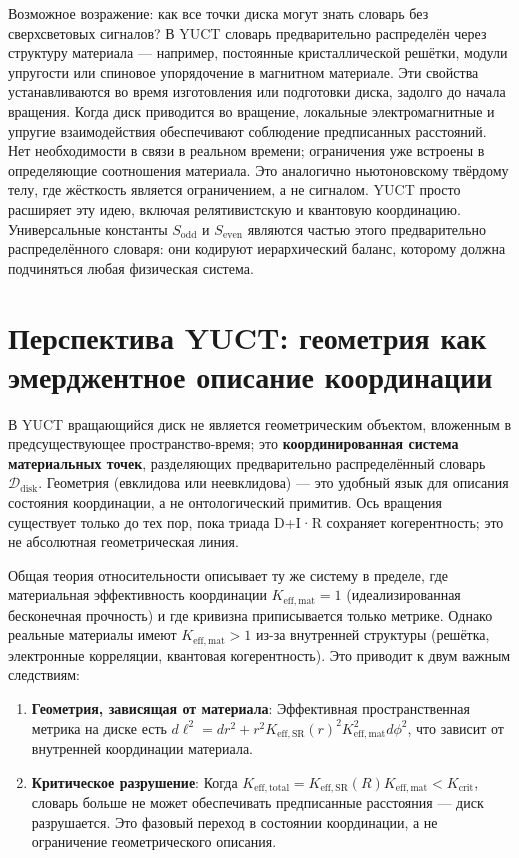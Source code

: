 \documentclass[12pt,a4paper]{article}
\newcommand{\Sodd}{S_{\mathrm{odd}}}
\newcommand{\Seven}{S_{\mathrm{even}}}
\begin{document}
	Возможное возражение: как все точки диска могут знать словарь без сверхсветовых сигналов? В YUCT словарь предварительно распределён через структуру материала — например, постоянные кристаллической решётки, модули упругости или спиновое упорядочение в магнитном материале. Эти свойства устанавливаются во время изготовления или подготовки диска, задолго до начала вращения. Когда диск приводится во вращение, локальные электромагнитные и упругие взаимодействия обеспечивают соблюдение предписанных расстояний. Нет необходимости в связи в реальном времени; ограничения уже встроены в определяющие соотношения материала. Это аналогично ньютоновскому твёрдому телу, где жёсткость является ограничением, а не сигналом. YUCT просто расширяет эту идею, включая релятивистскую и квантовую координацию. Универсальные константы \(\Sodd\) и \(\Seven\) являются частью этого предварительно распределённого словаря: они кодируют иерархический баланс, которому должна подчиняться любая физическая система.
	
	\section{Перспектива YUCT: геометрия как эмерджентное описание координации}
	
	В YUCT вращающийся диск не является геометрическим объектом, вложенным в предсуществующее пространство-время; это \textbf{координированная система материальных точек}, разделяющих предварительно распределённый словарь \(\mathcal{D}_{\text{disk}}\). Геометрия (евклидова или неевклидова) — это удобный язык для описания состояния координации, а не онтологический примитив. Ось вращения существует только до тех пор, пока триада D+I·R сохраняет когерентность; это не абсолютная геометрическая линия.
	
	Общая теория относительности описывает ту же систему в пределе, где материальная эффективность координации \(K_{\mathrm{eff,mat}} = 1\) (идеализированная бесконечная прочность) и где кривизна приписывается только метрике. Однако реальные материалы имеют \(K_{\mathrm{eff,mat}} > 1\) из-за внутренней структуры (решётка, электронные корреляции, квантовая когерентность). Это приводит к двум важным следствиям:
	
	\begin{enumerate}
		\item \textbf{Геометрия, зависящая от материала}: Эффективная пространственная метрика на диске есть \(d\ell^2 = dr^2 + r^2 K_{\mathrm{eff,SR}}(r)^2 K_{\mathrm{eff,mat}}^2 d\phi^2\), что зависит от внутренней координации материала.
		\item \textbf{Критическое разрушение}: Когда \(K_{\mathrm{eff,total}} = K_{\mathrm{eff,SR}}(R) K_{\mathrm{eff,mat}} < K_{\mathrm{crit}}\), словарь больше не может обеспечивать предписанные расстояния — диск разрушается. Это фазовый переход в состоянии координации, а не ограничение геометрического описания.
	\end{enumerate}
	
\end{document}
